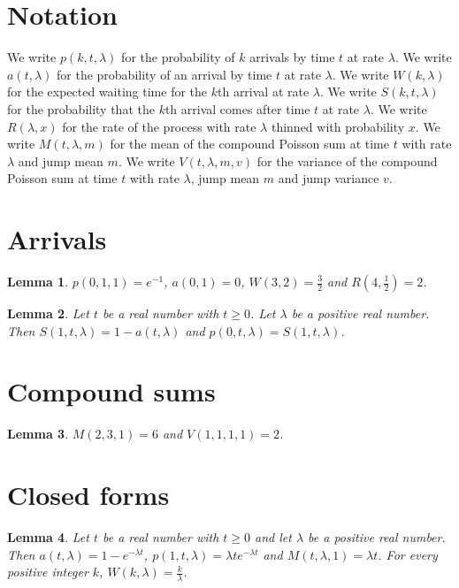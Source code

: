 \documentclass{article}
\newtheorem{lemma}{Lemma}
\begin{document}
\section{Notation}

We write $p(k,t,\lambda)$ for the probability of $k$ arrivals by time $t$ at rate $\lambda$.
We write $a(t,\lambda)$ for the probability of an arrival by time $t$ at rate $\lambda$.
We write $W(k,\lambda)$ for the expected waiting time for the $k$th arrival at rate $\lambda$.
We write $S(k,t,\lambda)$ for the probability that the $k$th arrival comes after time $t$ at rate $\lambda$.
We write $R(\lambda,x)$ for the rate of the process with rate $\lambda$ thinned with probability $x$.
We write $M(t,\lambda,m)$ for the mean of the compound Poisson sum at time $t$ with rate $\lambda$ and jump mean $m$.
We write $V(t,\lambda,m,v)$ for the variance of the compound Poisson sum at time $t$ with rate $\lambda$, jump mean $m$ and jump variance $v$.

\section{Arrivals}

\begin{lemma}\label{values}
$p(0,1,1)=e^{-1}$, $a(0,1)=0$, $W(3,2)=\frac32$ and $R(4,\frac12)=2$.
\end{lemma}

\begin{lemma}\label{first}
Let $t$ be a real number with $t\ge0$. Let $\lambda$ be a positive real number. Then $S(1,t,\lambda)=1-a(t,\lambda)$ and $p(0,t,\lambda)=S(1,t,\lambda)$.
\end{lemma}

\section{Compound sums}

\begin{lemma}\label{compound}
$M(2,3,1)=6$ and $V(1,1,1,1)=2$.
\end{lemma}

\section{Closed forms}

\begin{lemma}\label{closed}
Let $t$ be a real number with $t\ge0$ and let $\lambda$ be a positive real number. Then $a(t,\lambda)=1-e^{-\lambda t}$, $p(1,t,\lambda)=\lambda te^{-\lambda t}$ and $M(t,\lambda,1)=\lambda t$. For every positive integer $k$, $W(k,\lambda)=\frac{k}{\lambda}$.
\end{lemma}
\end{document}
